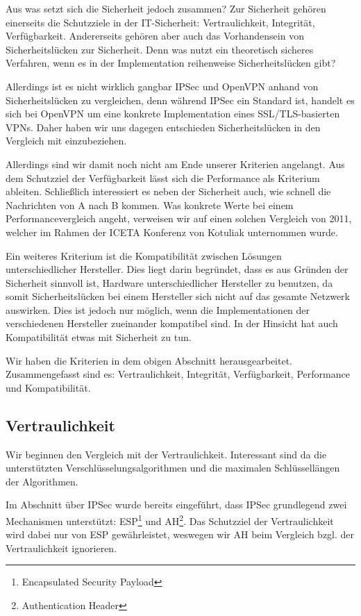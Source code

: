 \documentclass[12pt]{scrartcl}
\begin{document}
Aus was setzt sich die Sicherheit jedoch zusammen? Zur Sicherheit gehören einerseits die Schutzziele in der IT-Sicherheit: Vertraulichkeit, Integrität, Verfügbarkeit. Andererseits gehören aber auch das Vorhandensein von Sicherheitslücken zur Sicherheit. Denn was nutzt ein theoretisch sicheres Verfahren, wenn es in der Implementation reihenweise Sicherheitslücken gibt?

Allerdings ist es nicht wirklich gangbar IPSec und OpenVPN anhand von Sicherheitslücken zu vergleichen, denn während IPSec ein Standard ist\cite{RFC4301}, handelt es sich bei OpenVPN um eine konkrete Implementation eines SSL/TLS-basierten VPNs\cite{Kotuliak2011}. Daher haben wir uns dagegen entschieden Sicherheitslücken in den Vergleich mit einzubeziehen.

Allerdings sind wir damit noch nicht am Ende unserer Kriterien angelangt. Aus dem Schutzziel der Verfügbarkeit lässt sich die Performance als Kriterium ableiten. Schließlich interessiert es neben der Sicherheit auch, wie schnell die Nachrichten von A nach B kommen. Was konkrete Werte bei einem Performancevergleich angeht, verweisen wir auf einen solchen Vergleich von 2011, welcher im Rahmen der ICETA Konferenz von Kotuliak\cite{Kotuliak2011} unternommen wurde.

Ein weiteres Kriterium ist die Kompatibilität zwischen Lösungen unterschiedlicher Hersteller. Dies liegt darin begründet, dass es aus Gründen der Sicherheit sinnvoll ist, Hardware unterschiedlicher Hersteller zu benutzen, da somit Sicherheitslücken bei einem Hersteller sich nicht auf das gesamte Netzwerk auswirken. Dies ist jedoch nur möglich, wenn die Implementationen der verschiedenen Hersteller zueinander kompatibel sind. In der Hinsicht hat auch Kompatibilität etwas mit Sicherheit zu tun.

Wir haben die Kriterien in dem obigen Abschnitt herausgearbeitet. Zusammengefasst sind es: Vertraulichkeit, Integrität, Verfügbarkeit, Performance und Kompatibilität.

\subsection{Vertraulichkeit}
Wir beginnen den Vergleich mit der Vertraulichkeit. Interessant sind da die unterstützten Verschlüsselungsalgorithmen und die maximalen Schlüssellängen der Algorithmen.

Im Abschnitt über IPSec wurde bereits eingeführt, dass IPSec grundlegend zwei Mechanismen unterstützt: ESP\footnote{Encapsulated Security Payload} und AH\footnote{Authentication Header}. Das Schutzziel der Vertraulichkeit wird dabei nur von ESP gewährleistet, weswegen wir AH beim Vergleich bzgl. der Vertraulichkeit ignorieren.
\end{document}
